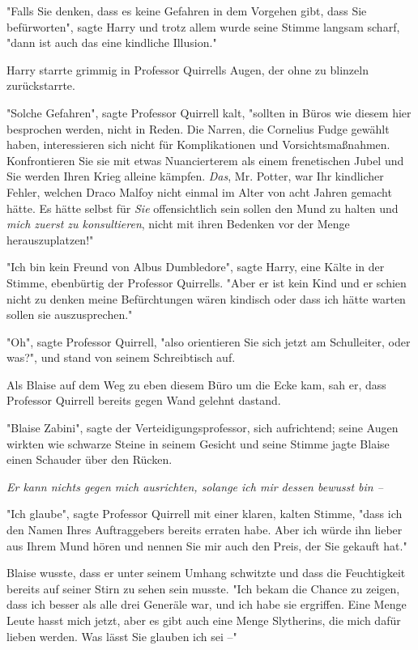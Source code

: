 {"Falls Sie denken, dass es keine Gefahren in dem Vorgehen gibt, dass Sie befürworten", sagte Harry und trotz allem wurde seine Stimme langsam scharf, "dann ist auch das eine kindliche Illusion."

Harry starrte grimmig in Professor Quirrells Augen, der ohne zu blinzeln zurückstarrte.

"Solche Gefahren", sagte Professor Quirrell kalt, "sollten in Büros wie diesem hier besprochen werden, nicht in Reden. Die Narren, die Cornelius Fudge gewählt haben, interessieren sich nicht für Komplikationen und Vorsichtsmaßnahmen. Konfrontieren Sie sie mit etwas Nuancierterem als einem frenetischen Jubel und Sie werden Ihren Krieg alleine kämpfen. \emph{Das}, Mr. Potter, war Ihr kindlicher Fehler, welchen Draco Malfoy nicht einmal im Alter von acht Jahren gemacht hätte. Es hätte selbst für \emph{Sie} offensichtlich sein sollen den Mund zu halten und \emph{mich zuerst zu konsultieren}, nicht mit ihren Bedenken vor der Menge herauszuplatzen!"

"Ich bin kein Freund von Albus Dumbledore", sagte Harry, eine Kälte in der Stimme, ebenbürtig der Professor Quirrells. "Aber er ist kein Kind und er schien nicht zu denken meine Befürchtungen wären kindisch oder dass ich hätte warten sollen sie auszusprechen."

"Oh", sagte Professor Quirrell, "also orientieren Sie sich jetzt am Schulleiter, oder was?", und stand von seinem Schreibtisch auf.

Als Blaise auf dem Weg zu eben diesem Büro um die Ecke kam, sah er, dass Professor Quirrell bereits gegen Wand gelehnt dastand.

"Blaise Zabini", sagte der Verteidigungsprofessor, sich aufrichtend; seine Augen wirkten wie schwarze Steine in seinem Gesicht und seine Stimme jagte Blaise einen Schauder über den Rücken.

\emph{Er kann nichts gegen mich ausrichten, solange ich mir dessen bewusst bin --}

"Ich glaube", sagte Professor Quirrell mit einer klaren, kalten Stimme, "dass ich den Namen Ihres Auftraggebers bereits erraten habe. Aber ich würde ihn lieber aus Ihrem Mund hören und nennen Sie mir auch den Preis, der Sie gekauft hat."

Blaise wusste, dass er unter seinem Umhang schwitzte und dass die Feuchtigkeit bereits auf seiner Stirn zu sehen sein musste. "Ich bekam die Chance zu zeigen, dass ich besser als alle drei Generäle war, und ich habe sie ergriffen. Eine Menge Leute hasst mich jetzt, aber es gibt auch eine Menge Slytherins, die mich dafür lieben werden. Was lässt Sie glauben ich sei --"

}
